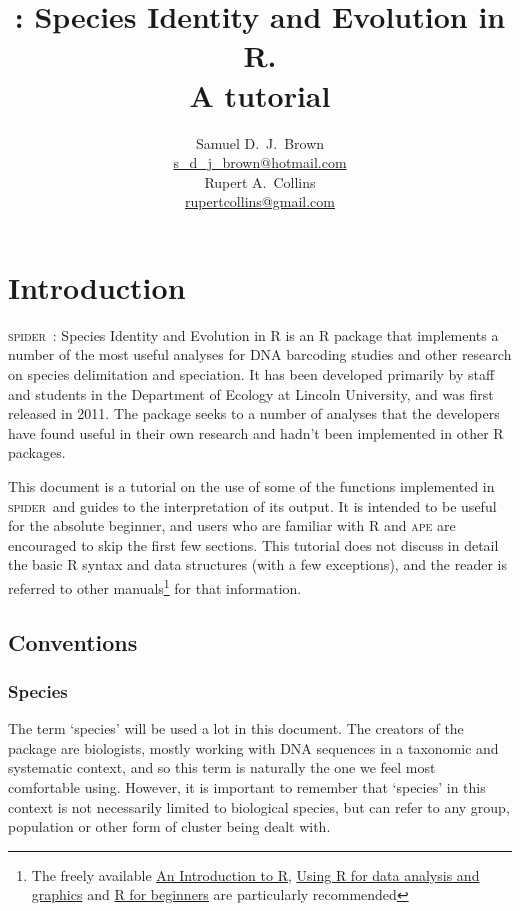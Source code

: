 \documentclass{article}
\title{\Spider: Species Identity and Evolution in R.\\ A tutorial}
\author{Samuel D.\ J.\ Brown\\\href{mailto:s_d_j_brown@hotmail.com}
{s\_d\_j\_brown@hotmail.com}\\Rupert A.\ Collins\\\href{mailto:rupertcollins@gmail.com}{rupertcollins@gmail.com}}
\newcommand{\spider}{\textsc{spider}~} %
\newcommand{\progname}[1]{\textsc{#1}}
\begin{document}


\maketitle


\section{Introduction}
\spider: Species Identity and Evolution in R is an \progname{R} package that implements a number of the most useful analyses for DNA barcoding studies and other research on species delimitation and speciation. It has been developed primarily by staff and students in the Department of Ecology at Lincoln University, and was first released in 2011. The package seeks to a number of analyses that the developers have found useful in their own research and hadn't been implemented in other \progname{R} packages. 

This document is a tutorial on the use of some of the functions implemented in \spider and guides to the interpretation of its output. It is intended to be useful for the absolute beginner, and users who are familiar with \progname{R} and \progname{ape} are encouraged to skip the first few sections. This tutorial does not discuss in detail the basic \progname{R} syntax and data structures (with a few exceptions), and the reader is referred to other manuals\footnote{The freely available \href{http://cran.r-project.org/doc/manuals/R-intro.pdf}{An Introduction to R}, \href{http://cran.r-project.org/doc/contrib/usingR.pdf}{Using R for data analysis and graphics} and \href{http://cran.r-project.org/doc/contrib/Paradis-rdebuts_en.pdf}{R for beginners} are particularly recommended} for that information.

\subsection{Conventions}

\subsubsection{Species}
\label{speciesDef}
The term `species' will be used a lot in this document. The creators of the package are biologists, mostly working with DNA sequences in a taxonomic and systematic context, and so this term is naturally the one we feel most comfortable using. However, it is important to remember that `species' in this context is not necessarily limited to biological species, but can refer to any group, population or other form of cluster being dealt with. 
\end{document}
